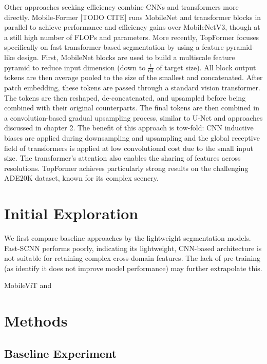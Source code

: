 \documentclass[a4paper,12pt]{report}
\begin{document}
Other approaches seeking efficiency combine CNNs and transformers more directly. Mobile-Former [TODO CITE] runs MobileNet and transformer blocks in parallel to achieve performance and efficiency gains over MobileNetV3, though at a still high number of FLOPs and parameters. More recently, TopFormer \cite{zhang_topformer_2022} focuses specifically on fast transformer-based segmentation by using a feature pyramid-like design. First, MobileNet blocks are used to build a multiscale feature pyramid to reduce input dimension (down to $\frac{1}{64}$ of target size). All block output tokens are then average pooled to the size of the smallest and concatenated. After patch embedding, these tokens are passed through a standard vision transformer. The tokens are then reshaped, de-concatenated, and upsampled before being combined with their original counterparts. The final tokens are then combined in a convolution-based gradual upsampling process, similar to U-Net \cite{ronneberger_u-net_2015} and approaches discussed in chapter 2. The benefit of this approach is tow-fold: CNN inductive biases are applied during downsampling and upsampling and the global receptive field of transformers is applied at low convolutional cost due to the small input size. The transformer's attention also enables the sharing of features across resolutions. TopFormer achieves particularly strong results on the challenging ADE20K dataset, known for its complex scenery.


\section{Initial Exploration}
We first compare baseline approaches by the lightweight segmentation models. Fast-SCNN performs poorly, indicating its lightweight, CNN-based architecture is not suitable for retaining complex cross-domain features. The lack of pre-training (as \cite{poudel_fast-scnn_2019} identify it does not improve model performance) may further extrapolate this.

MobileViT and 



\section{Methods}

\subsection{Baseline Experiment}
\end{document}
